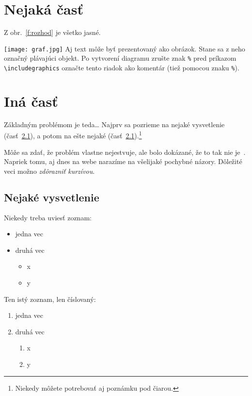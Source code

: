 \documentclass[10pt,twoside,slovak,a4paper]{coursepaper}
\begin{document}
\section{Nejaká časť} \label{nejaka}

Z obr.~\ref{f:rozhod} je všetko jasné. 

\begin{figure*}[tbh]
\centering
\texttt{[image: graf.jpg]}
Aj text môže byť prezentovaný ako obrázok. Stane sa z neho označný plávajúci objekt. Po vytvorení diagramu zrušte znak \texttt{\%} pred príkazom \verb|\includegraphics| označte tento riadok ako komentár (tiež pomocou znaku \texttt{\%}).
\caption{Rozhodujúci argument.}
\label{f:rozhod}
\end{figure*}



\section{Iná časť} \label{ina}

Základným problémom je teda\ldots{} Najprv sa pozrieme na nejaké vysvetlenie (časť~\ref{ina:nejake}), a potom na ešte nejaké (časť~\ref{ina:nejake}).\footnote{Niekedy môžete potrebovať aj poznámku pod čiarou.}

Môže sa zdať, že problém vlastne nejestvuje\cite{Coplien:MPD}, ale bolo dokázané, že to tak nie je~\cite{Czarnecki:Staged, Czarnecki:Progress}. Napriek tomu, aj dnes na webe narazíme na všelijaké pochybné názory\cite{PLP-Framework}. Dôležité veci možno \emph{zdôrazniť kurzívou}.


\subsection{Nejaké vysvetlenie} \label{ina:nejake}

Niekedy treba uviesť zoznam:

\begin{itemize}
\item jedna vec
\item druhá vec
	\begin{itemize}
	\item x
	\item y
	\end{itemize}
\end{itemize}

Ten istý zoznam, len číslovaný:

\begin{enumerate}
\item jedna vec
\item druhá vec
	\begin{enumerate}
	\item x
	\item y
	\end{enumerate}
\end{enumerate}
\end{document}
